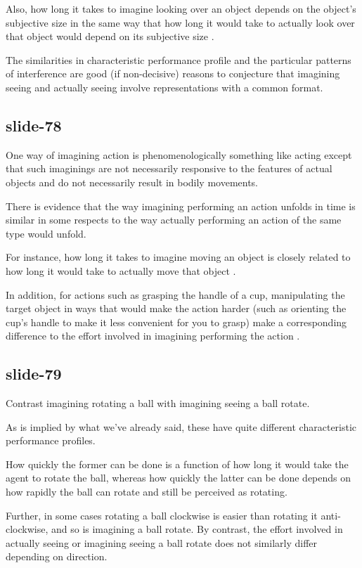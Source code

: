 \documentclass[12pt,\papersize]{extarticle}
\begin{document}
Also, how long it takes to imagine looking over an object depends on the object's subjective size in
the same way that how long it would take to actually look over that object would depend on its
subjective size \citep{kosslyn:1978_visual}.
 
The similarities in characteristic performance profile and the particular patterns of interference
are good (if non-decisive) reasons to conjecture that imagining seeing and actually seeing involve
representations with a common format.
 
\subsection{slide-78}
One way of imagining action is phenomenologically something like acting except
that such imaginings are not necessarily responsive to the features of actual
objects and do not necessarily result in bodily movements.
 
There is evidence that the way imagining performing an action unfolds in time is
similar in some respects to the way actually performing an action of the same type would unfold.
 
For instance, how long it takes to imagine moving an object is closely related to
how long it would take to actually move that object \citep{decety:1989_timing,
decety:1996_imagined, Jeannerod:1994oz}.
 
In addition, for actions such as grasping the handle of a cup, manipulating the
target object in ways that would make the action harder (such as orienting the cup's
handle to make it less convenient for you to grasp) make a corresponding difference to
the effort involved in imagining performing the action \citep{parsons:1994_temporal,
frak:2001_orientation}.
 
\subsection{slide-79}
Contrast imagining rotating a ball with imagining seeing a ball rotate.
 
As is implied by what we’ve already said, these have quite different characteristic performance
profiles.
 
How quickly the former can be done is a function of how long it would take the agent to rotate the
ball, whereas how quickly the latter can be done depends on how rapidly the ball can rotate and
still be perceived as rotating.
 
Further, in some cases rotating a ball clockwise is easier than rotating it anti-clockwise, and so
is imagining a ball rotate. By contrast, the effort involved in actually seeing or imagining seeing
a ball rotate does not similarly differ depending on direction.
 
\end{document}
